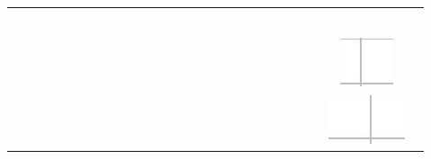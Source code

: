 \documentclass[10pt]{article}
\begin{document}
\begin{center}
\begin{tabular}{|c|c|c|c|c|c|c|c|c|c|c|c|c|c|c|c|c|c|c|c|c|c|c|c|c|c|c|}
 &  \\
\hline
 &  &  &  &  &  &  &  &  &  &  &  &  &  &  &  &  &  &  &  &  &  &  &  &  &  &  \\
\hline
 &  &  &  &  &  &  &  &  &  &  &  &  &  &  &  &  &  &  &  &  &  &  &  &  &  &  \\
\hline
 &  &  &  &  &  &  &  &  &  &  &  &  &  &  &  &  &  &  &  &  &  &  &  &  &  &  \\
\hline
 &  &  &  &  &  &  &  &  &  &  &  &  &  &  &  &  &  &  &  &  &  &  &  &  &  &  \\
\hline
 &  &  &  &  &  &  &  &  &  &  &  &  &  &  &  &  &  &  &  &  &  &  &  &  &  &  \\
\hline
 &  &  &  &  &  &  &  &  &  &  &  &  &  &  &  &  &  &  &  &  &  &  &  &  &  &  \\
\hline
 &  &  &  &  &  &  &  &  &  &  &  &  &  &  &  &  &  &  &  &  &  &  &  &  & \includegraphics[max width=\textwidth]{2024_11_21_7b5527312ea89ae66fd0g-24}
 &  \\
\hline
 &  &  &  &  &  &  &  &  &  &  &  &  &  &  &  &  &  &  &  &  &  &  &  &  & \includegraphics[max width=\textwidth]{2024_11_21_7b5527312ea89ae66fd0g-24(5)}

\end{tabular}
\end{center}
\end{document}

